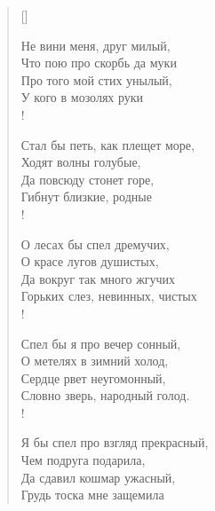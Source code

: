 \settowidth{\versewidth}{\vinЧто пою про скорбь да муки\ldotst}
\begin{verse}[\versewidth]
\begin{altverse}
Не вини меня, друг милый,\\
    Что пою про скорбь да муки\ldotst\\
Про того мой стих унылый,\\
    У кого в мозолях руки\ldotst\\!

Стал бы петь, как плещет море,\\
    Ходят волны голубые,\\
Да повсюду стонет горе,\\
    Гибнут близкие, родные\ldotst\\!

О лесах бы спел дремучих,\\
    О красе лугов душистых,\\
Да вокруг так много жгучих\\
    Горьких слез, невинных, чистых\ldotst\\!

Спел бы я про вечер сонный,\\
    О метелях в зимний холод,\\
Сердце рвет неугомонный,\\
    Словно зверь, народный голод.\\!

Я бы спел про взгляд прекрасный,\\
    Чем подруга подарила,\\
Да сдавил кошмар ужасный,\\
    Грудь тоска мне защемила\ldotst
\end{altverse}
\end{verse}

\newpage
\vspace*{0cm}


\newpage

